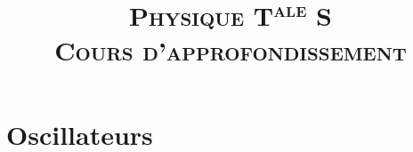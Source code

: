 \documentclass{book}
\title{
    \textsc{
        Physique T\textsuperscript{ale} S \\ Cours d'approfondissement
    }
}
\author{}
\theoremstyle{definition}
\theoremstyle{plain}
\theoremstyle{remark}
\newcommand{\onlyinsubfile}[1]{#1}
\newcommand{\notinsubfile}[1]{}
\begin{document}
\renewcommand{\onlyinsubfile}[1]{}
\renewcommand{\notinsubfile}[1]{#1}

\maketitle

\chapter{Oscillateurs}

    
\end{document}
